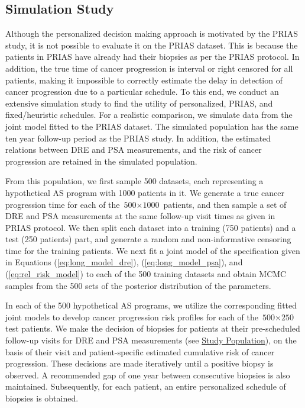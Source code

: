 
\subsection{Simulation Study}
\label{subsec:sim_study}
Although the personalized decision making approach is motivated by the PRIAS study, it is not possible to evaluate it on the PRIAS dataset. This is because the patients in PRIAS have already had their biopsies as per the PRIAS protocol. In addition, the true time of cancer progression is interval or right censored for all patients, making it impossible to correctly estimate the delay in detection of cancer progression due to a particular schedule. To this end, we conduct an extensive simulation study to find the utility of personalized, PRIAS, and fixed/heuristic schedules. For a realistic comparison, we simulate data from the joint model fitted to the PRIAS dataset. The simulated population has the same ten year follow-up period as the PRIAS study. In addition, the estimated relations between DRE and PSA measurements, and the risk of cancer progression are retained in the simulated population.

From this population, we first sample 500 datasets, each representing a hypothetical AS program with 1000 patients in it. We generate a true cancer progression time for each of the ${\mbox{500} \times \mbox{1000}}$ patients, and then sample a set of DRE and PSA measurements at the same follow-up visit times as given in PRIAS protocol. We then split each dataset into a training (750 patients) and a test (250 patients) part, and generate a random and non‐informative censoring time for the training patients. We next fit a joint model of the specification given in Equations (\ref{eq:long_model_dre}), (\ref{eq:long_model_psa}), and (\ref{eq:rel_risk_model}) to each of the 500 training datasets and obtain MCMC samples from the 500 sets of the posterior distribution of the parameters. 

In each of the 500 hypothetical AS programs, we utilize the corresponding fitted joint models to develop cancer progression risk profiles for each of the ${\mbox{500} \times \mbox{250}}$ test patients. We make the decision of biopsies for patients at their pre-scheduled follow-up visits for DRE and PSA measurements (see \hyperref[subsec:study_population]{Study Population}), on the basis of their visit and patient-specific estimated cumulative risk of cancer progression. These decisions are made iteratively until a positive biopsy is observed. A recommended gap of one year between consecutive biopsies\cite{bokhorst2015compliance} is also maintained. Subsequently, for each patient, an entire personalized schedule of biopsies is obtained.

